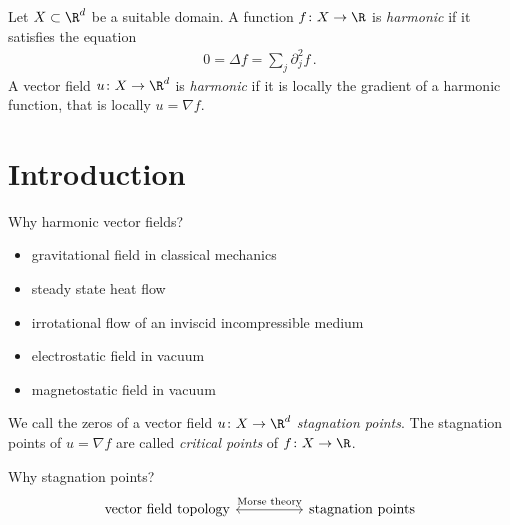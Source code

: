 
\begin{frame}
  \begin{definition}
    Let $X\subset\R^d$ be a suitable domain.
    A function $f\colon X\to\R$ is \emph{harmonic} if it satisfies the equation
    \begin{align*}
      0=\Delta f=\sum_j\partial_j^2f\,.
    \end{align*}
    A vector field $u\colon X\to\R^d$ is \emph{harmonic} if it is locally the gradient of a harmonic function, that is locally $u=\nabla f$.
  \end{definition}
\end{frame}

\section{Introduction}
\begin{frame}[fragile]
  \begin{block}{Why harmonic vector fields?}
    \begin{itemize}
      \item gravitational field in classical mechanics
      \item steady state heat flow
      \item irrotational flow of an inviscid incompressible medium
      \item electrostatic field in vacuum
      \item magnetostatic field in vacuum
    \end{itemize}
  \end{block}
\end{frame}

\begin{frame}[fragile]
  \begin{definition}
    We call the zeros of a vector field $u\colon X\to\R^d$ \emph{stagnation points}.
    The stagnation points of $u=\nabla f$ are called \emph{critical points} of $f\colon X\to\R$.
  \end{definition}
  \begin{block}{Why stagnation points?}
    \tikzset{external/export=false}
    \[\begin{tikzcd}[column sep=huge]
      \text{vector field topology} \arrow[r,leftrightarrow,"\text{Morse theory}"] &\text{stagnation points}
    \end{tikzcd}\]
  \end{block}
  
\end{frame}

